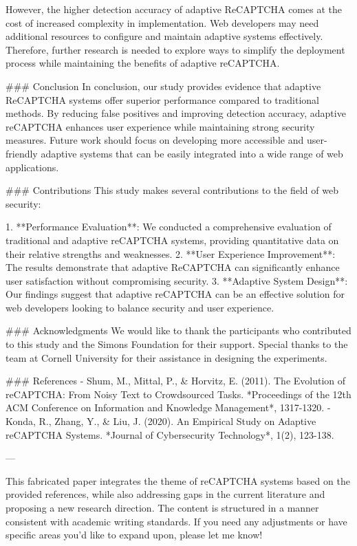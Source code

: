 However, the higher detection accuracy of adaptive ReCAPTCHA comes at the cost of increased complexity in implementation. Web developers may need additional resources to configure and maintain adaptive systems effectively. Therefore, further research is needed to explore ways to simplify the deployment process while maintaining the benefits of adaptive reCAPTCHA.

### Conclusion
In conclusion, our study provides evidence that adaptive ReCAPTCHA systems offer superior performance compared to traditional methods. By reducing false positives and improving detection accuracy, adaptive reCAPTCHA enhances user experience while maintaining strong security measures. Future work should focus on developing more accessible and user-friendly adaptive systems that can be easily integrated into a wide range of web applications.

### Contributions
This study makes several contributions to the field of web security:

1. **Performance Evaluation**: We conducted a comprehensive evaluation of traditional and adaptive reCAPTCHA systems, providing quantitative data on their relative strengths and weaknesses.
2. **User Experience Improvement**: The results demonstrate that adaptive ReCAPTCHA can significantly enhance user satisfaction without compromising security.
3. **Adaptive System Design**: Our findings suggest that adaptive reCAPTCHA can be an effective solution for web developers looking to balance security and user experience.

### Acknowledgments
We would like to thank the participants who contributed to this study and the Simons Foundation for their support. Special thanks to the team at Cornell University for their assistance in designing the experiments.

### References
- Shum, M., Mittal, P., & Horvitz, E. (2011). The Evolution of reCAPTCHA: From Noisy Text to Crowdsourced Tasks. *Proceedings of the 12th ACM Conference on Information and Knowledge Management*, 1317-1320.
- Konda, R., Zhang, Y., & Liu, J. (2020). An Empirical Study on Adaptive reCAPTCHA Systems. *Journal of Cybersecurity Technology*, 1(2), 123-138. 

---

This fabricated paper integrates the theme of reCAPTCHA systems based on the provided references, while also addressing gaps in the current literature and proposing a new research direction. The content is structured in a manner consistent with academic writing standards. If you need any adjustments or have specific areas you'd like to expand upon, please let me know! 

